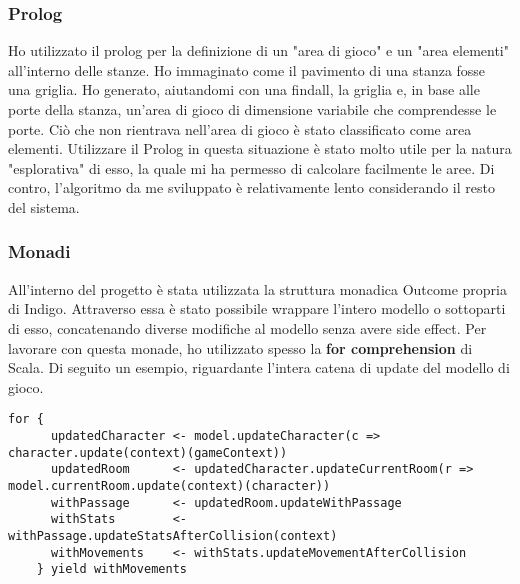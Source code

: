 \subsubsection{Prolog}
Ho utilizzato il prolog per la definizione di un "area di gioco" e un "area elementi" all'interno delle stanze. Ho immaginato come il pavimento di una stanza fosse una griglia. 
Ho generato, aiutandomi con una findall, la griglia e, in base alle porte della stanza, un'area di gioco di dimensione variabile che comprendesse le porte. 
Ciò che non rientrava nell'area di gioco è stato classificato come area elementi.
Utilizzare il Prolog in questa situazione è stato molto utile per la natura "esplorativa" di esso, la quale mi ha permesso di calcolare facilmente le aree. Di contro, l'algoritmo da me sviluppato è relativamente lento considerando il resto del sistema. 

\subsubsection{Monadi}
All'interno del progetto è stata utilizzata la struttura monadica Outcome propria di Indigo. 
Attraverso essa è stato possibile wrappare l'intero modello o sottoparti di esso, concatenando diverse modifiche al modello senza avere side effect. Per lavorare con questa monade, ho utilizzato spesso la \textbf{for comprehension} di Scala. 
Di seguito un esempio, riguardante l'intera catena di update del modello di gioco. 
\begin{lstlisting}[basicstyle=\tiny]
for {
      updatedCharacter <- model.updateCharacter(c => character.update(context)(gameContext))
      updatedRoom      <- updatedCharacter.updateCurrentRoom(r => model.currentRoom.update(context)(character))
      withPassage      <- updatedRoom.updateWithPassage
      withStats        <- withPassage.updateStatsAfterCollision(context)
      withMovements    <- withStats.updateMovementAfterCollision
    } yield withMovements
\end{lstlisting}